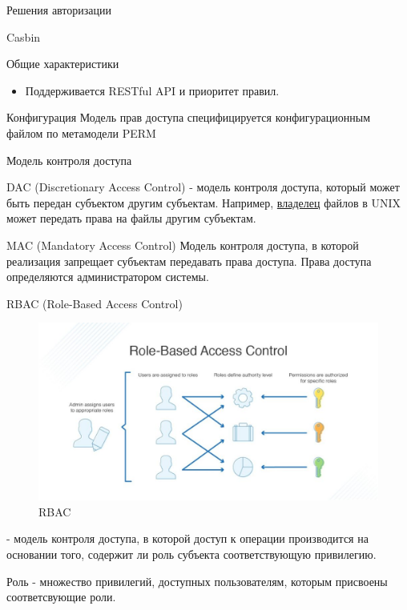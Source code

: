 \documentclass[presentation]{beamer}
\begin{document}
\begin{frame}[label={sec:org24b9295},fragile]{Решения авторизации}
\begin{block}{Casbin}
\begin{block}{Общие характеристики}
\begin{itemize}
\item Поддерживается RESTful API и приоритет правил.
\end{itemize}
\end{block}

\begin{block}{Конфигурация}
Модель прав доступа специфицируется конфигурационным файлом по метамодели PERM
\end{block}
\end{block}
\end{frame}
\begin{frame}[label={sec:org374a28e}]{Модель контроля доступа}
\begin{block}{DAC (Discretionary Access Control)}
\label{orga701860} - модель контроля доступа, который может быть передан субъектом другим субъектам. Например, \uline{владелец} файлов в UNIX может передать права на файлы другим субъектам.
\end{block}

\begin{block}{MAC (Mandatory Access Control)}
Модель контроля доступа, в которой реализация запрещает субъектам передавать права доступа. Права доступа определяются администратором системы.
\end{block}



\begin{block}{RBAC (Role-Based Access Control)}
\begin{figure}[htbp]
\centering
\includegraphics[width=.9\linewidth]{./img/rbac.jpg}
\caption{\label{fig:org8cfd3d4}RBAC}
\end{figure}

\label{org03a534b} - модель контроля доступа, в которой доступ к операции  производится на основании того, содержит ли роль субъекта соответствующую привилегию.

Роль - множество привилегий, доступных пользователям, которым присвоены соответсвующие роли.


\end{block}
\end{frame}
\end{document}
